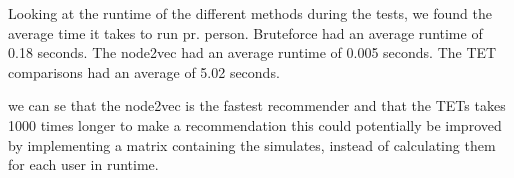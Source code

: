 Looking at the runtime of the different methods during the tests, we found the average time it takes to run pr. person.
Bruteforce had an average runtime of 0.18 seconds.
The node2vec had an average runtime of 0.005 seconds.
The TET comparisons had an average of 5.02 seconds.

we can se that the node2vec is the fastest recommender and that the TETs takes 1000 times longer to make a recommendation this could potentially be improved by implementing a matrix containing the simulates, instead of calculating them for each user in runtime.
